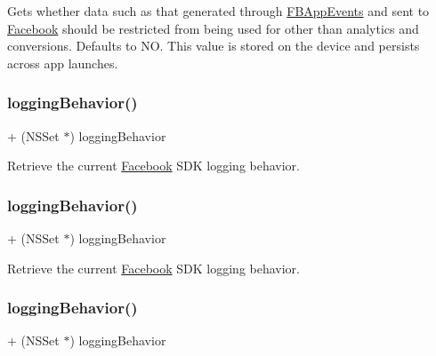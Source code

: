 Gets whether data such as that generated through \hyperlink{interfaceFBAppEvents}{F\+B\+App\+Events} and sent to \hyperlink{interfaceFacebook}{Facebook} should be restricted from being used for other than analytics and conversions. Defaults to NO. This value is stored on the device and persists across app launches. \mbox{\label{interfaceFBSettings_a6fe525188c97270c4d4a6781c4d6ee11}} 
\subsubsection{\texorpdfstring{logging\+Behavior()}{loggingBehavior()}\hspace{0.1cm}{\footnotesize\ttfamily [1/5]}}
{\footnotesize\ttfamily + (N\+S\+Set $\ast$) logging\+Behavior \begin{DoxyParamCaption}{ }\end{DoxyParamCaption}}

Retrieve the current \hyperlink{interfaceFacebook}{Facebook} S\+DK logging behavior. \mbox{\label{interfaceFBSettings_a6fe525188c97270c4d4a6781c4d6ee11}} 
\subsubsection{\texorpdfstring{logging\+Behavior()}{loggingBehavior()}\hspace{0.1cm}{\footnotesize\ttfamily [2/5]}}
{\footnotesize\ttfamily + (N\+S\+Set $\ast$) logging\+Behavior \begin{DoxyParamCaption}{ }\end{DoxyParamCaption}}

Retrieve the current \hyperlink{interfaceFacebook}{Facebook} S\+DK logging behavior. \mbox{\label{interfaceFBSettings_a6fe525188c97270c4d4a6781c4d6ee11}} 
\subsubsection{\texorpdfstring{logging\+Behavior()}{loggingBehavior()}\hspace{0.1cm}{\footnotesize\ttfamily [3/5]}}
{\footnotesize\ttfamily + (N\+S\+Set $\ast$) logging\+Behavior \begin{DoxyParamCaption}{ }\end{DoxyParamCaption}}

